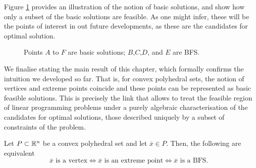 Figure \ref{p1c2:fig:BFS} provides an illustration of the notion of basic solutions, and show how only a subset of the basic solutions are feasible. As one might infer, these will be the points of interest in out future developments, as these are the candidates for optimal solution.

\begin{figure}[h]
	\caption{Points $A$ to $F$ are basic solutions; $B$,$C$,$D$, and $E$ are BFS.} \label{p1c2:fig:BFS}
\end{figure}		

We finalise stating the main result of this chapter, which formally confirms the intuition we developed so far. That is, for convex polyhedral sets, the notion of vertices and extreme points coincide and these points can be represented as basic feasible solutions. This is precisely the link that allows to treat the feasible region of linear programming problems under a purely algebraic characterisation of the candidates for optimal solutions, those described uniquely by a subset of constraints of the problem.

\begin{theorem}\label{p1c2:thm:BFS_vertex_extreme_point}
	Let $P \subset \mathbb{R}^n$ be a convex polyhedral set and let $\overline{x} \in P$. Then, the following are equivalent
	$$	\overline{x} \text{ is a vertex} \iff \overline{x} \text{ is an extreme point} \iff \overline{x} \text{ is a BFS}.	
	$$
\end{theorem}


